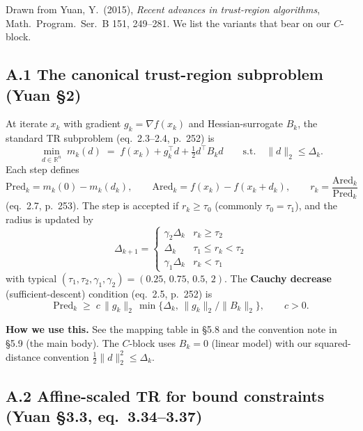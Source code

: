 \documentclass[11pt,a4paper]{article}
\begin{document}
Drawn from Yuan, Y.\ (2015), \emph{Recent advances in trust-region algorithms}, Math.\ Program.\ Ser.\ B 151, 249--281. We list the variants that bear on our $C$-block.

\subsection{A.1\; The canonical trust-region subproblem (Yuan \S 2)}

At iterate $x_k$ with gradient $g_k = \nabla f(x_k)$ and Hessian-surrogate $B_k$, the standard TR subproblem (eq.\ 2.3--2.4, p.\ 252) is
\begin{equation}
\min_{d \in \mathbb{R}^n}\; m_k(d) \;=\; f(x_k) + g_k^\top d + \tfrac12 d^\top B_k d\qquad\text{s.t.}\quad \|d\|_2 \le \Delta_k.
\tag{TR}
\end{equation}
Each step defines
\[
\text{Pred}_k = m_k(0) - m_k(d_k),\qquad \text{Ared}_k = f(x_k) - f(x_k + d_k),\qquad r_k = \frac{\text{Ared}_k}{\text{Pred}_k}
\]
(eq.\ 2.7, p.\ 253). The step is accepted if $r_k \ge \tau_0$ (commonly $\tau_0 = \tau_1$), and the radius is updated by
\[
\Delta_{k+1} = \begin{cases}\gamma_2 \Delta_k & r_k \ge \tau_2 \\ \Delta_k & \tau_1 \le r_k < \tau_2 \\ \gamma_1 \Delta_k & r_k < \tau_1\end{cases}
\]
with typical $(\tau_1,\tau_2,\gamma_1,\gamma_2) = (0.25,\,0.75,\,0.5,\,2)$. The \textbf{Cauchy decrease} (sufficient-descent) condition (eq.\ 2.5, p.\ 252) is
\[
\text{Pred}_k \;\ge\; c\,\|g_k\|_2\,\min\!\Big\{\Delta_k,\,\|g_k\|_2/\|B_k\|_2\Big\},\qquad c > 0.
\]

\textbf{How we use this.} See the mapping table in \S 5.8 and the convention note in \S 5.9 (the main body). The $C$-block uses $B_k = 0$ (linear model) with our squared-distance convention $\tfrac12\|d\|_2^2 \le \Delta_k$.

\subsection{A.2\; Affine-scaled TR for bound constraints (Yuan \S 3.3, eq.\ 3.34--3.37)}
\end{document}

